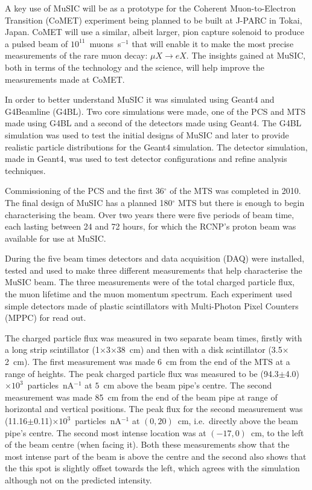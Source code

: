 A key use of MuSIC will be as a prototype for the Coherent Muon-to-Electron Transition (CoMET) experiment being planned to be built at J-PARC in Tokai, Japan. CoMET will use a similar, albeit larger, pion capture solenoid to produce a pulsed beam of \(10^{11}\)~muons~s\(^{-1}\) that will enable it to make the most precise measurements of the rare muon decay: \(\mu X\rightarrow eX\). The insights gained at MuSIC, both in terms of the technology and the science, will help improve the measurements made at CoMET. 

In order to better understand MuSIC it was simulated using Geant4 and G4Beamline (G4BL). Two core simulations were made, one of the PCS and MTS made using G4BL and a second of the detectors made using Geant4. The G4BL simulation was used to test the initial designs of MuSIC and later to provide realistic particle distributions for the Geant4 simulation. The detector simulation, made in Geant4, was used to test detector configurations and refine analysis techniques.

Commissioning of the PCS and the first 36\(^{\circ}\) of the MTS was completed in 2010. The final design of MuSIC has a planned 180\(^{\circ}\) MTS but there is enough to begin characterising the beam. Over two years there were five periods of beam time, each lasting between 24 and 72 hours, for which the RCNP's proton beam was available for use at MuSIC. 

During the five beam times detectors and data acquisition (DAQ) were installed, tested and used to make three different measurements that help characterise the MuSIC beam. The three measurements were of the total charged particle flux, the muon lifetime and the muon momentum spectrum. Each experiment used simple detectors made of plastic scintillators with Multi-Photon Pixel Counters (MPPC) for read out. 

The charged particle flux was measured in two separate beam times, firstly with a long strip scintillator (1\(\times\)3\(\times\)38~cm) and then with a disk scintillator (3.5\(\times\)2~cm). The first measurement was made 6~cm from the end of the MTS at a range of heights. The peak charged particle flux was measured to be (94.3\(\pm\)4.0)\(\times10^3\)~particles~nA\(^{-1}\) at \(5\)~cm above the beam pipe's centre. The second measurement was made 85~cm from the end of the beam pipe at range of horizontal and vertical positions. The peak flux for the second measurement was (11.16\(\pm\)0.11)\(\times10^3\)~particles~nA\(^{-1}\) at \((0, 20)\)~cm, i.e.\ directly above the beam pipe's centre. The second most intense location was at \((-17, 0)\)~cm, to the left of the beam centre (when facing it). Both these measurements show that the most intense part of the beam is above the centre and the second also shows that the this spot is slightly offset towards the left, which agrees with the simulation although not on the predicted intensity.

